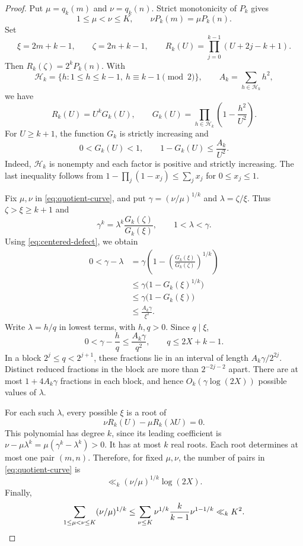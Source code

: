 \begin{proof}
Put $\mu=q_k(m)$ and $\nu=q_k(n)$. Strict monotonicity of $P_k$ gives
\begin{equation}\label{eq:quotient-curve}
1\le\mu<\nu\le K,\qquad \nu P_k(m)=\mu P_k(n).
\end{equation}
Set
\[
\xi=2m+k-1,\qquad \zeta=2n+k-1,
\qquad
R_k(U)=\prod_{j=0}^{k-1}(U+2j-k+1).
\]
Then $R_k(\zeta)=2^kP_k(n)$. With
\[
\mathcal H_k=\{h:1\le h\le k-1,\ h\equiv k-1\pmod2\},
\qquad A_k=\sum_{h\in\mathcal H_k}h^2,
\]
we have
\[
R_k(U)=U^kG_k(U),\qquad
G_k(U)=\prod_{h\in\mathcal H_k}\left(1-\frac{h^2}{U^2}\right).
\]
For $U\ge k+1$, the function $G_k$ is strictly increasing and
\begin{equation}\label{eq:centered-defect}
0<G_k(U)<1,\qquad 1-G_k(U)\le\frac{A_k}{U^2}.
\end{equation}
Indeed, $\mathcal H_k$ is nonempty and each factor is positive and
strictly increasing. The last inequality follows from
$1-\prod_j(1-x_j)\le\sum_jx_j$ for $0\le x_j\le1$.

Fix $\mu,\nu$ in \eqref{eq:quotient-curve}, and put
$\gamma=(\nu/\mu)^{1/k}$ and $\lambda=\zeta/\xi$.
Thus $\zeta>\xi\ge k+1$ and
\[
\gamma^k=\lambda^k\frac{G_k(\zeta)}{G_k(\xi)},\qquad 1<\lambda<\gamma.
\]
Using \eqref{eq:centered-defect}, we obtain
\begin{align*}
0<\gamma-\lambda
&=\gamma\left(1-\left(\frac{G_k(\xi)}{G_k(\zeta)}\right)^{1/k}\right)\\
&\le\gamma\bigl(1-G_k(\xi)^{1/k}\bigr)\\
&\le\gamma\bigl(1-G_k(\xi)\bigr)\\
&\le\frac{A_k\gamma}{\xi^2}.
\end{align*}
Write $\lambda=h/q$ in lowest terms, with $h,q>0$. Since $q\mid\xi$,
\[
0<\gamma-\frac hq\le\frac{A_k\gamma}{q^2},\qquad q\le2X+k-1.
\]
In a block $2^j\le q<2^{j+1}$, these fractions lie in an interval of
length $A_k\gamma/2^{2j}$. Distinct reduced fractions in the block are
more than $2^{-2j-2}$ apart. There are at most $1+4A_k\gamma$ fractions
in each block, and hence $O_k(\gamma\log(2X))$ possible values of $\lambda$.

For each such $\lambda$, every possible $\xi$ is a root of
\[
\nu R_k(U)-\mu R_k(\lambda U)=0.
\]
This polynomial has degree $k$, since its leading coefficient is
$\nu-\mu\lambda^k=\mu(\gamma^k-\lambda^k)>0$.
It has at most $k$ real roots. Each root determines
at most one pair $(m,n)$. Therefore, for fixed $\mu,\nu$, the number of
pairs in \eqref{eq:quotient-curve} is
\[
\ll_k (\nu/\mu)^{1/k}\log(2X).
\]
Finally,
\[
\sum_{1\le\mu<\nu\le K}(\nu/\mu)^{1/k}
\le\sum_{\nu\le K}\nu^{1/k}\frac{k}{k-1}\nu^{1-1/k}
\ll_k K^2.
\qedhere
\]
\end{proof}

